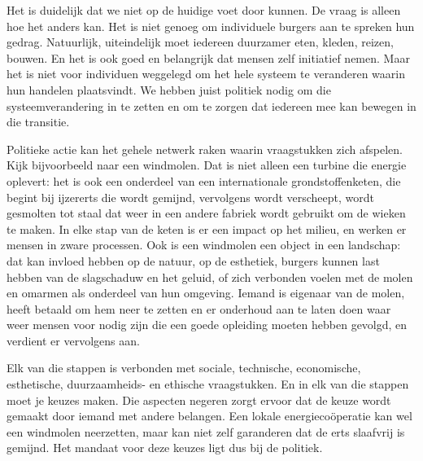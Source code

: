 
Het is duidelijk dat we niet op de huidige voet door kunnen. De vraag is alleen hoe het anders kan. Het is niet genoeg om individuele burgers aan te spreken hun gedrag. Natuurlijk, uiteindelijk moet iedereen duurzamer eten, kleden, reizen, bouwen. En het is ook goed en belangrijk dat mensen zelf initiatief nemen. Maar het is niet voor individuen weggelegd om het hele systeem te veranderen waarin hun handelen plaatsvindt. We hebben juist politiek nodig om die systeemverandering in te zetten en om te zorgen dat iedereen mee kan bewegen in die transitie.

Politieke actie kan het gehele netwerk raken waarin vraagstukken zich afspelen. Kijk bijvoorbeeld naar een windmolen. Dat is niet alleen een turbine die energie oplevert: het is ook een onderdeel van een internationale grondstoffenketen, die begint bij ijzererts die wordt gemijnd, vervolgens wordt verscheept, wordt gesmolten tot staal dat weer in een andere fabriek wordt gebruikt om de wieken te maken. In elke stap van de keten is er een impact op het milieu, en werken er mensen in zware processen. Ook is een windmolen een object in een landschap: dat kan invloed hebben op de natuur, op de esthetiek, burgers kunnen last hebben van de slagschaduw en het geluid, of zich verbonden voelen met de molen en omarmen als onderdeel van hun omgeving. Iemand is eigenaar van de molen, heeft betaald om hem neer te zetten en er onderhoud aan te laten doen waar weer mensen voor nodig zijn die een goede opleiding moeten hebben gevolgd, en verdient er vervolgens aan.

Elk van die stappen is verbonden met sociale, technische, economische, esthetische, duurzaamheids- en ethische vraagstukken. En in elk van die stappen moet je keuzes maken. Die aspecten negeren zorgt ervoor dat de keuze wordt gemaakt door iemand met andere belangen. Een lokale energiecoöperatie kan wel een windmolen neerzetten, maar kan niet zelf garanderen dat de erts slaafvrij is gemijnd. Het mandaat voor deze keuzes ligt dus bij de politiek.
